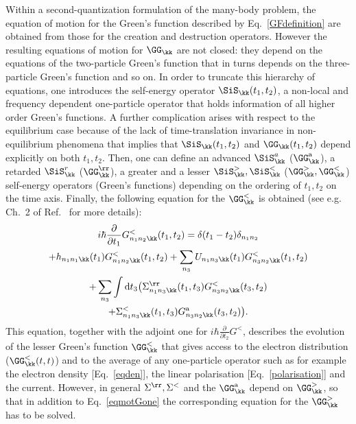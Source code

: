 Within a second-quantization formulation of the many-body problem, the equation of motion for the Green's function described by Eq.~\eqref{GFdefinition} are obtained
from those for the creation and destruction operators.  However the resulting equations of motion for $\GG_{\kk}$ are not closed:
they depend on the equations of the two-particle Green's function that in turns depends on the three-particle Green's function and so on.
In order to truncate this hierarchy of equations, one introduces the self-energy operator $\SiS_{\kk}(t_1,t_2)$, a non-local and frequency dependent
one-particle operator that holds information of all higher order Green's functions. 
A further complication arises with respect to the equilibrium case because of the lack of time-translation invariance in non-equilibrium phenomena that implies that 
$\SiS_{\kk}(t_1,t_2)$ and $\GG_{\kk}(t_1,t_2)$ depend explicitly on both $t_1,t_2$. Then, one can define an
advanced $\SiS_{\kk}^a$ ($\GG_{\kk}^{\mathrm a}$), a retarded $\SiS_{\kk}^r$ ($\GG_{\kk}^{\rr}$), a greater and a lesser $\SiS_{\kk}^>,\SiS_{\kk}^<$ ($\GG_{\kk}^>,\GG_{\kk}^<$) self-energy
operators (Green's functions) depending on the ordering of $t_1,t_2$ on the time axis. 
Finally, 
the following equation for the $\GG_{\kk}^<$ is obtained (see e.g. Ch.~2 of
Ref.~\cite{kremp} for more details):
\begin{multline}
 i\hbar  \frac{\partial}{\partial t_1} G^<_{n_1n_2\kk}(t_1,t_2)=\mbox{}  \delta(t_1-t_2)\delta_{n_1n_2}    \\
+  h_{n_1n_1\kk}(t_1) G^<_{n_1n_2\kk}(t_1,t_2) + \sum_{n_3}U_{n_1n_3\kk}(t_1) G^<_{n_3n_2\kk}(t_1,t_2) \\
+  \sum_{n_3} \int \mathrm{d}t_3 \big( \Sigma^{\rr}_{n_1n_3\kk}(t_1,t_3)G^<_{n_3n_2\kk }(t_3,t_2) \\
+ \Sigma^<_{n_1n_3\kk}(t_1,t_3) G^{\mathrm a}_{n_3n_2\kk}(t_3,t_2)\big) .
\label{eqmotGone}
\end{multline}
This equation, together with the adjoint one for $ i\hbar  \frac{\partial}{\partial t_2} G^<$, describes the
evolution of the lesser Green's function $\GG_{\kk}^<$ that gives
access to the electron distribution ($\GG_{\kk}^<(t,t)$) and to the
average of any one-particle operator such as for example the electron
density [Eq.~\eqref{eqden}], the linear polarisation [Eq.~\eqref{polarisation}] and the current.  However, in general $\Sigma^{\rr},\Sigma^<$ and the $\GG_{\kk}^{\mathrm a}$ depend on $\GG_{\kk}^>$, so that in addition to Eq.~\eqref{eqmotGone} the corresponding equation for the $\GG_{\kk}^>$ has to be solved. 

